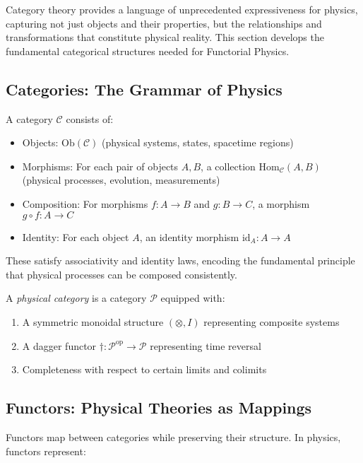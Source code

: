 Category theory provides a language of unprecedented expressiveness for physics, capturing not just objects and their properties, but the relationships and transformations that constitute physical reality. This section develops the fundamental categorical structures needed for Functorial Physics.

\subsection{Categories: The Grammar of Physics}

A category $\mathcal{C}$ consists of:
\begin{itemize}[leftmargin=*]
\item Objects: $\text{Ob}(\mathcal{C})$ (physical systems, states, spacetime regions)
\item Morphisms: For each pair of objects $A, B$, a collection $\text{Hom}_{\mathcal{C}}(A, B)$ (physical processes, evolution, measurements)
\item Composition: For morphisms $f: A \to B$ and $g: B \to C$, a morphism $g \circ f: A \to C$
\item Identity: For each object $A$, an identity morphism $\text{id}_A: A \to A$
\end{itemize}

These satisfy associativity and identity laws, encoding the fundamental principle that physical processes can be composed consistently.

\begin{definition}
A \emph{physical category} is a category $\mathcal{P}$ equipped with:
\begin{enumerate}
\item A symmetric monoidal structure $(\otimes, I)$ representing composite systems
\item A dagger functor $\dagger: \mathcal{P}^{\text{op}} \to \mathcal{P}$ representing time reversal
\item Completeness with respect to certain limits and colimits
\end{enumerate}
\end{definition}

\subsection{Functors: Physical Theories as Mappings}

Functors map between categories while preserving their structure. In physics, functors represent:

